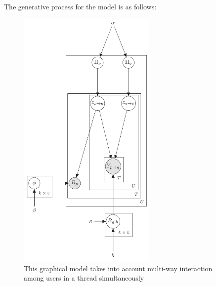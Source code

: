 The generative process for the model is as follows:

\begin{figure}
\centering
\includegraphics[width=0.6\textwidth]{pgm_ThreadBased.png}
\caption{This graphical model takes into account multi-way interaction among
users in a thread simultaneously}
\label{fig:finalThreadAggregationModel}
\end{figure}

